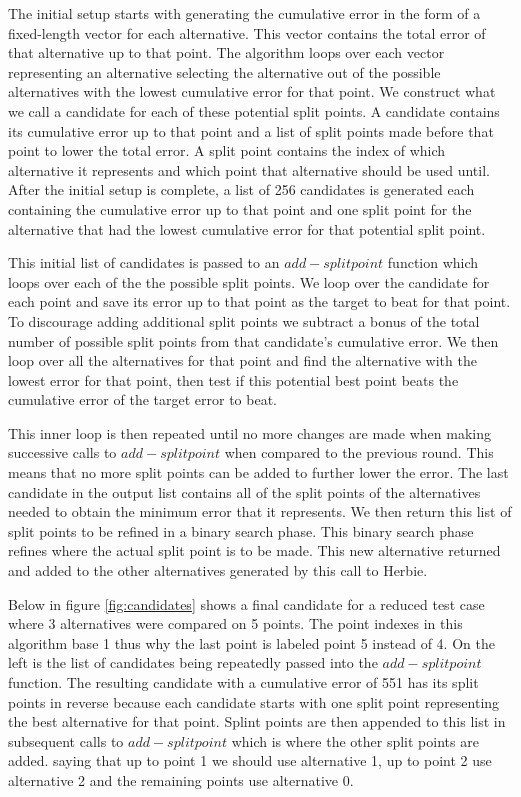 \documentclass{article}
\begin{document}
The initial setup starts with generating the cumulative error in the form of a fixed-length vector for each alternative. This vector contains the total error of that alternative up to that point. The algorithm loops over each vector representing an alternative selecting the alternative out of the possible alternatives with the lowest cumulative error for that point. We construct what we call a candidate for each of these potential split points. A candidate contains its cumulative error up to that point and a list of split points made before that point to lower the total error. A split point contains the index of which alternative it represents and which point that alternative should be used until. After the initial setup is complete, a list of 256 candidates is generated each containing the cumulative error up to that point and one split point for the alternative that had the lowest cumulative error for that potential split point.

This initial list of candidates is passed to an $add-splitpoint$  function which loops over each of the the possible split points. We loop over the candidate for each point and save its error up to that point as the target to beat for that point. To discourage adding additional split points we subtract a bonus of the total number of possible split points from that candidate's cumulative error. We then loop over all the alternatives for that point and find the alternative with the lowest error for that point, then test if this potential best point beats the cumulative error of the target error to beat.

This inner loop is then repeated until no more changes are made when making successive calls to $add-splitpoint$  when compared to the previous round. This means that no more split points can be added to further lower the error. The last candidate in the output list contains all of the split points of the alternatives needed to obtain the minimum error that it represents. We then return this list of split points to be refined in a binary search phase. This binary search phase refines where the actual split point is to be made. This new alternative returned and added to the other alternatives generated by this call to Herbie.

Below in figure \ref{fig:candidates} shows a final candidate for a reduced test case where 3 alternatives were compared on 5 points. The point indexes in this algorithm base 1 thus why the last point is labeled point 5 instead of 4. On the left is the list of candidates being repeatedly passed into the $add-splitpoint$  function. The resulting candidate with a cumulative error of 551 has its split points in reverse because each candidate starts with one split point representing the best alternative for that point. Splint points are then appended to this list in subsequent calls to $add-splitpoint$  which is where the other split points are added. saying that up to point 1 we should use alternative 1, up to point 2 use alternative 2 and the remaining points use alternative 0.
\end{document}
